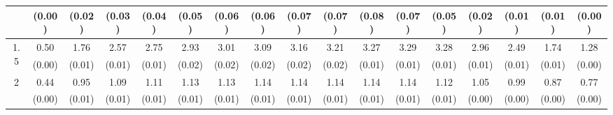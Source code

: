 \documentclass[12pt]{article}  %
\theoremstyle{plain}
\begin{document}
\begin{sidewaystable}[htbp]
\begin{tabular}{ccccccccccccccccc}
                       & (0.00)& (0.02)& (0.03)& (0.04)& (0.05)& (0.06)& (0.06)& (0.07)& (0.07)&  (0.08)&  (0.07)&  (0.05)&  (0.02)&  (0.01)&  (0.01) &   (0.00)\\ \hline                                                                                                                                                                                                                                                                                    
\multirow{2}{*}{1.5}  &  0.50& 1.76&  2.57 & 2.75 & 2.93 &  3.01  & 3.09 &  3.16 &  3.21  & 3.27  & 3.29 & 3.28 & 2.96 & 2.49 & 1.74 & 1.28\\
                      &  (0.00)& (0.01)& (0.01)& (0.01)& (0.02)& (0.02)& (0.02)& (0.02)& (0.02)&  (0.01)&  (0.01)&  (0.01)&  (0.01)&  (0.01) & (0.01) &     (0.00)\\ \hline                                                                                                                                                                                                                                                                                    
\multirow{2}{*}{2}  &0.44& 0.95 & 1.09 & 1.11  & 1.13 &  1.13  & 1.14 &  1.14  & 1.14 &  1.14  & 1.14 & 1.12 & 1.05&  0.99 & 0.87 & 0.77\\
                      &  (0.00)& (0.01)& (0.01)& (0.01)& (0.01)& (0.01)& (0.01)& (0.01)& (0.01)&  (0.01)&  (0.01)&  (0.01)&  (0.00)&  (0.00)&  (0.00)  &     (0.00)\\ \hline                                                                                                                                                                                                                                                                                    
\end{tabular}
\end{sidewaystable}
\end{document}
